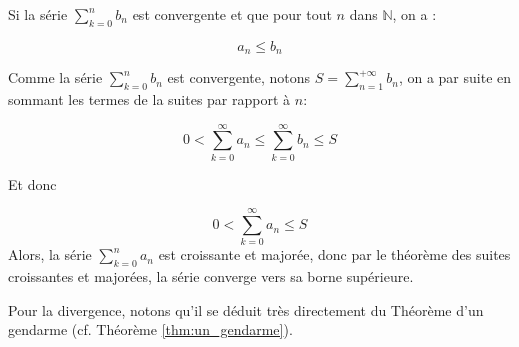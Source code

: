 Si la série $\sum_{k = 0}^{n} b_n$ est convergente et que pour tout $n$ dans $\mathbb{N}$, on a :

$$ a_n \leq b_n $$

Comme la série $\sum_{k = 0}^{n} b_n$ est convergente, notons $S = \sum_{n=1}^{+\infty} b_n$, on a par suite en sommant les termes de la suites par rapport à $n$:

$$0 < \sum_{k = 0}^{\infty} a_n \leq \sum_{k = 0}^{\infty} b_n \leq S $$


Et donc

$$0 < \sum_{k = 0}^{\infty} a_n \leq  S $$
Alors, la série $\sum_{k = 0}^{n} a_n$ est croissante et majorée, donc par le théorème des suites croissantes et majorées, la série converge vers sa borne supérieure.

Pour la divergence, notons qu'il se déduit très directement du Théorème d'un gendarme (cf. Théorème \ref{thm:un_gendarme}).


    

